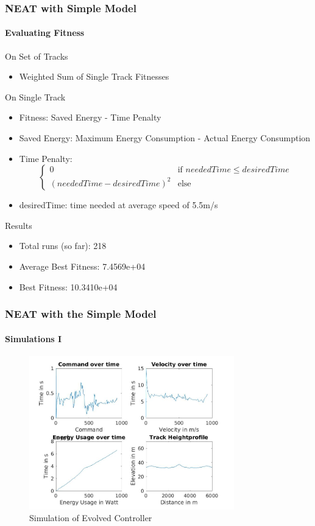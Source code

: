 \documentclass[8pt]{beamer}
\begin{document}
\begin{frame}
	\frametitle{NEAT with Simple Model}
	\framesubtitle{Evaluating Fitness}
	\begin{block}{On Set of Tracks}
		\begin{itemize}
			\item Weighted Sum of Single Track Fitnesses
		\end{itemize}
	\end{block}
	\begin{block}{On Single Track}
		\begin{itemize}		
			\item Fitness: Saved Energy - Time Penalty
			\item Saved Energy: Maximum Energy Consumption - Actual Energy Consumption
			\item Time Penalty: \[\left\{ 
				\begin{array}{ll}
					0  & \mbox{if } neededTime \leq desiredTime \\
					(neededTime - desiredTime)^2 & \mbox{else } 
				\end{array}			
			\right. \]	
			\item desiredTime: time needed at average speed of 5.5m/s		
		\end{itemize}
	\end{block}	
	\begin{block}{Results}
	\begin{itemize}
		\item Total runs (so far): 218
		\item Average Best Fitness: 7.4569e+04
		\item Best Fitness: 10.3410e+04
	\end{itemize}
	\end{block}
	
\end{frame}


\begin{frame}
	\frametitle{NEAT with the Simple Model}
	\framesubtitle{Simulations I}
	\begin{figure}[hb]
  		\centering
  		\includegraphics[width=3.5in]{images/result8.jpg}
  		\caption[Simulation of Evolved Controller]
   		{Simulation of Evolved Controller}
		\end{figure}
\end{frame}
\end{document}
